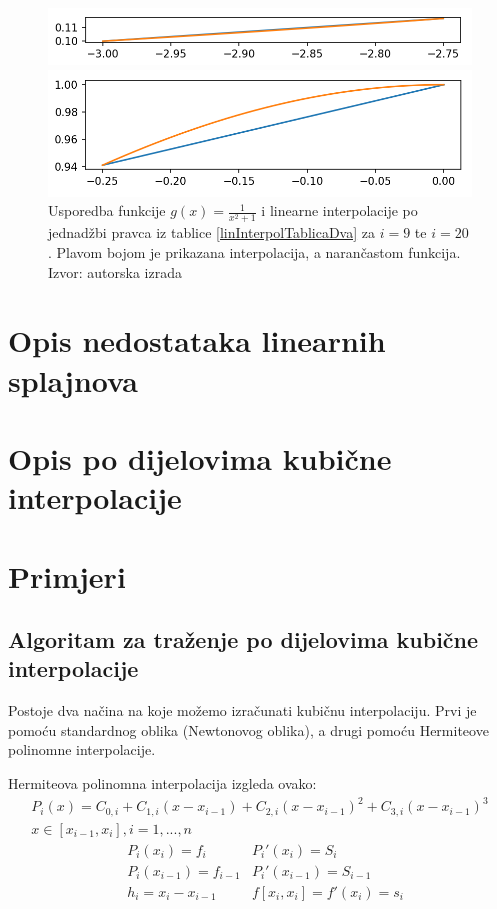\documentclass[12pt,a4paper]{report}
\begin{document}
			\begin{figure}[H]
				\centering
				
					\includegraphics[width=\textwidth]{slike/usporedba58.png}
				
					\includegraphics[width=\textwidth]{slike/usporedba519.png}
				
				\caption{Usporedba funkcije $g(x)=\frac{1}{x^2 +1}$ i linearne interpolacije po jednadžbi pravca iz tablice \ref{linInterpolTablicaDva} za $i=9$ te $i=20$. Plavom bojom je prikazana interpolacija, a narančastom funkcija. Izvor: autorska izrada}
				\label{linInterSlika2}
			\end{figure}
			
			
			
	\section{Opis nedostataka linearnih splajnova}
	\section{Opis po dijelovima kubične interpolacije}
	\section{Primjeri}
		\subsection{Algoritam za traženje po dijelovima kubične interpolacije}
		Postoje dva načina na koje možemo izračunati kubičnu interpolaciju. Prvi je pomoću standardnog oblika (Newtonovog oblika), a drugi pomoću Hermiteove polinomne interpolacije.
		
		Hermiteova polinomna interpolacija izgleda ovako:
		\begin{align*}
		P_i(x)=C_{0,i}+C_{1,i}(x-x_{i-1})+C_{2,i}(x-x_{i-1})^2+C_{3,i}(x-x_{i-1})^3 \\
		x\in[x_{i-1}, x_i], i=1,...,n
		\end{align*}
		\begin{align*}
			&P_i(x_i)=f_i &P_i'(x_i)=S_i\\
			&P_i(x_{i-1})=f_{i-1} &P_i'(x_{i-1})=S_{i-1}\\
			&h_i=x_i-x_{i-1} &f[x_i, x_i]=f'(x_i)=s_i
		\end{align*}
		
\end{document}
